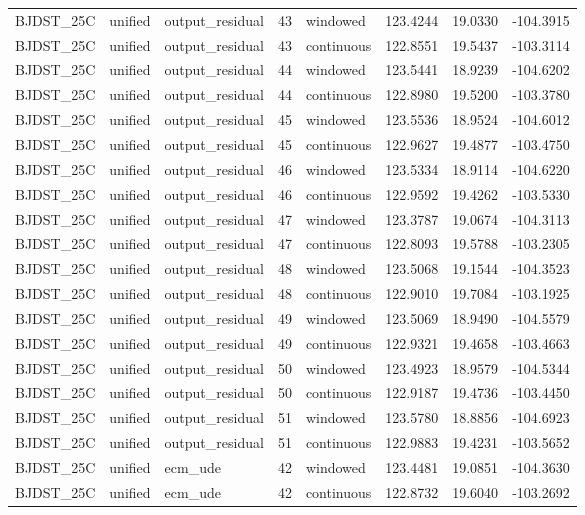 \begin{tabular}{llllllll}
BJDST\_25C & unified & output\_residual & 43 & windowed & 123.4244 & 19.0330 & -104.3915 \\
BJDST\_25C & unified & output\_residual & 43 & continuous & 122.8551 & 19.5437 & -103.3114 \\
BJDST\_25C & unified & output\_residual & 44 & windowed & 123.5441 & 18.9239 & -104.6202 \\
BJDST\_25C & unified & output\_residual & 44 & continuous & 122.8980 & 19.5200 & -103.3780 \\
BJDST\_25C & unified & output\_residual & 45 & windowed & 123.5536 & 18.9524 & -104.6012 \\
BJDST\_25C & unified & output\_residual & 45 & continuous & 122.9627 & 19.4877 & -103.4750 \\
BJDST\_25C & unified & output\_residual & 46 & windowed & 123.5334 & 18.9114 & -104.6220 \\
BJDST\_25C & unified & output\_residual & 46 & continuous & 122.9592 & 19.4262 & -103.5330 \\
BJDST\_25C & unified & output\_residual & 47 & windowed & 123.3787 & 19.0674 & -104.3113 \\
BJDST\_25C & unified & output\_residual & 47 & continuous & 122.8093 & 19.5788 & -103.2305 \\
BJDST\_25C & unified & output\_residual & 48 & windowed & 123.5068 & 19.1544 & -104.3523 \\
BJDST\_25C & unified & output\_residual & 48 & continuous & 122.9010 & 19.7084 & -103.1925 \\
BJDST\_25C & unified & output\_residual & 49 & windowed & 123.5069 & 18.9490 & -104.5579 \\
BJDST\_25C & unified & output\_residual & 49 & continuous & 122.9321 & 19.4658 & -103.4663 \\
BJDST\_25C & unified & output\_residual & 50 & windowed & 123.4923 & 18.9579 & -104.5344 \\
BJDST\_25C & unified & output\_residual & 50 & continuous & 122.9187 & 19.4736 & -103.4450 \\
BJDST\_25C & unified & output\_residual & 51 & windowed & 123.5780 & 18.8856 & -104.6923 \\
BJDST\_25C & unified & output\_residual & 51 & continuous & 122.9883 & 19.4231 & -103.5652 \\
BJDST\_25C & unified & ecm\_ude & 42 & windowed & 123.4481 & 19.0851 & -104.3630 \\
BJDST\_25C & unified & ecm\_ude & 42 & continuous & 122.8732 & 19.6040 & -103.2692 \\

\end{tabular}
